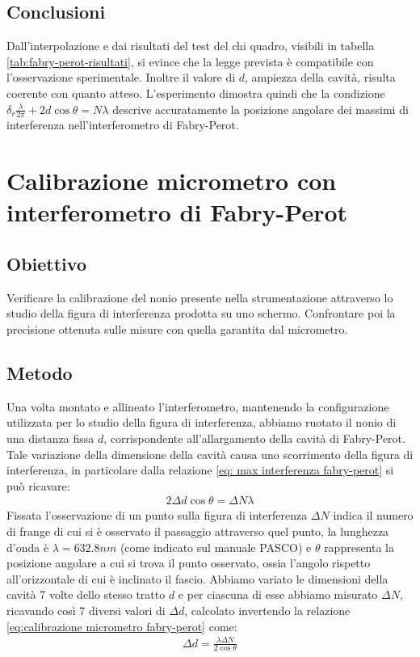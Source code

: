 \documentclass[a4paper]{article}
\begin{document}
\subsection{Conclusioni}
Dall'interpolazione e dai risultati del test del chi quadro, visibili in tabella \ref{tab:fabry-perot-risultati}, si evince che la legge prevista è compatibile con l'osservazione sperimentale. Inoltre il valore di $d$, ampiezza della cavità, risulta coerente con quanto atteso. L'esperimento dimostra quindi che la condizione $\delta_r\frac{\lambda}{2\pi}+2d \cos \theta = N\lambda$ descrive accuratamente la posizione angolare dei massimi di interferenza nell'interferometro di Fabry-Perot. 

\section{Calibrazione micrometro con interferometro di Fabry-Perot}
\subsection{Obiettivo}
Verificare la calibrazione del nonio presente nella strumentazione attraverso lo studio della figura di interferenza prodotta su uno schermo.
Confrontare poi la precisione ottenuta sulle misure con quella garantita dal micrometro.
\subsection{Metodo}
Una volta montato e allineato l'interferometro, mantenendo la configurazione utilizzata per lo studio della figura di interferenza, abbiamo ruotato il 
nonio di una distanza fissa $d$, corrispondente all'allargamento della cavità di Fabry-Perot. Tale variazione della dimensione della cavità causa uno
scorrimento della figura di interferenza, in particolare dalla relazione \ref{eq: max interferenza fabry-perot} si può ricavare:
\begin{align}
    2 \Delta d \cos  \theta = \Delta N \lambda
\label{eq:calibrazione micrometro fabry-perot}
\end{align}
Fissata l'osservazione di un punto sulla figura di interferenza $\Delta N$ indica il numero di frange di cui si è osservato il passaggio attraverso quel punto, la lunghezza d'onda è $\lambda = 632.8 nm$ (come indicato sul manuale PASCO) e $\theta$ rappresenta la posizione angolare a cui si trova il punto osservato, ossia l'angolo rispetto all'orizzontale di cui è inclinato il fascio.
Abbiamo variato le dimensioni della cavità 7 volte dello stesso tratto $d$ e per ciascuna di esse abbiamo misurato $\Delta N$, ricavando così 7 diversi valori di $\Delta d$, calcolato invertendo la relazione \ref{eq:calibrazione micrometro fabry-perot} come:
\begin{align}
    \Delta d = \frac{\lambda \Delta N}{2\cos{\theta}}
\label{eq:calibrazione micrometro fabry-perot invertita}
\end{align}
\end{document}
